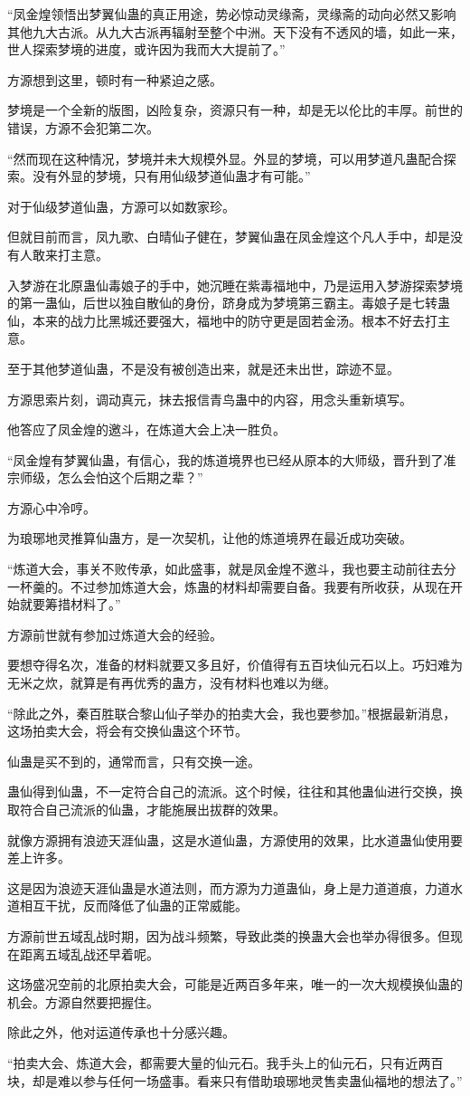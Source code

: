 \begin{this_body}
“凤金煌领悟出梦翼仙蛊的真正用途，势必惊动灵缘斋，灵缘斋的动向必然又影响其他九大古派。从九大古派再辐射至整个中洲。天下没有不透风的墙，如此一来，世人探索梦境的进度，或许因为我而大大提前了。”

方源想到这里，顿时有一种紧迫之感。

梦境是一个全新的版图，凶险复杂，资源只有一种，却是无以伦比的丰厚。前世的错误，方源不会犯第二次。

“然而现在这种情况，梦境并未大规模外显。外显的梦境，可以用梦道凡蛊配合探索。没有外显的梦境，只有用仙级梦道仙蛊才有可能。”

对于仙级梦道仙蛊，方源可以如数家珍。

但就目前而言，凤九歌、白晴仙子健在，梦翼仙蛊在凤金煌这个凡人手中，却是没有人敢来打主意。

入梦游在北原蛊仙毒娘子的手中，她沉睡在紫毒福地中，乃是运用入梦游探索梦境的第一蛊仙，后世以独自散仙的身份，跻身成为梦境第三霸主。毒娘子是七转蛊仙，本来的战力比黑城还要强大，福地中的防守更是固若金汤。根本不好去打主意。

至于其他梦道仙蛊，不是没有被创造出来，就是还未出世，踪迹不显。

方源思索片刻，调动真元，抹去报信青鸟蛊中的内容，用念头重新填写。

他答应了凤金煌的邀斗，在炼道大会上决一胜负。

“凤金煌有梦翼仙蛊，有信心，我的炼道境界也已经从原本的大师级，晋升到了准宗师级，怎么会怕这个后期之辈？”

方源心中冷哼。

为琅琊地灵推算仙蛊方，是一次契机，让他的炼道境界在最近成功突破。

“炼道大会，事关不败传承，如此盛事，就是凤金煌不邀斗，我也要主动前往去分一杯羹的。不过参加炼道大会，炼蛊的材料却需要自备。我要有所收获，从现在开始就要筹措材料了。”

方源前世就有参加过炼道大会的经验。

要想夺得名次，准备的材料就要又多且好，价值得有五百块仙元石以上。巧妇难为无米之炊，就算是有再优秀的蛊方，没有材料也难以为继。

“除此之外，秦百胜联合黎山仙子举办的拍卖大会，我也要参加。”根据最新消息，这场拍卖大会，将会有交换仙蛊这个环节。

仙蛊是买不到的，通常而言，只有交换一途。

蛊仙得到仙蛊，不一定符合自己的流派。这个时候，往往和其他蛊仙进行交换，换取符合自己流派的仙蛊，才能施展出拔群的效果。

就像方源拥有浪迹天涯仙蛊，这是水道仙蛊，方源使用的效果，比水道蛊仙使用要差上许多。

这是因为浪迹天涯仙蛊是水道法则，而方源为力道蛊仙，身上是力道道痕，力道水道相互干扰，反而降低了仙蛊的正常威能。

方源前世五域乱战时期，因为战斗频繁，导致此类的换蛊大会也举办得很多。但现在距离五域乱战还早着呢。

这场盛况空前的北原拍卖大会，可能是近两百多年来，唯一的一次大规模换仙蛊的机会。方源自然要把握住。

除此之外，他对运道传承也十分感兴趣。

“拍卖大会、炼道大会，都需要大量的仙元石。我手头上的仙元石，只有近两百块，却是难以参与任何一场盛事。看来只有借助琅琊地灵售卖蛊仙福地的想法了。”

\end{this_body}

